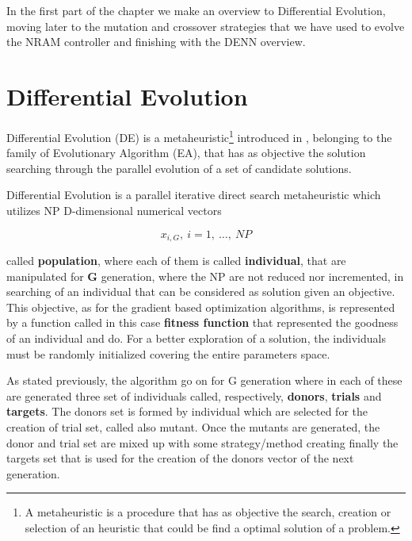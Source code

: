 \label{chap:differential-evolution}
In the first part of the chapter we make an overview to Differential Evolution, moving later to the mutation and crossover strategies that we have used to evolve the NRAM controller and finishing with the DENN overview.

\section{Differential Evolution}
Differential Evolution (DE) is a metaheuristic\footnote{A metaheuristic is a procedure that has as objective the search, creation or selection of an heuristic that could be find a optimal solution of a problem.} introduced in \cite{DESEHGOCS:1997}, belonging to the family of Evolutionary Algorithm (EA), that has as objective the solution searching through the parallel evolution of a set of candidate solutions. 

Differential Evolution is a parallel iterative direct search metaheuristic which utilizes NP D-dimensional numerical vectors 
\begin{center}
	\begin{equation}
		x_{i, G},\ i=1,\ \dots,\ NP 
	\end{equation}
\end{center}
called \textbf{population}, where each of them is called \textbf{individual}, that are manipulated for \textbf{G} generation, where the NP are not reduced nor incremented, in searching of an individual that can be considered as solution given an objective. This objective, as for the gradient based optimization algorithms, is represented by a function called in this case \textbf{fitness function} that represented the goodness of an individual and do. For a better exploration of a solution, the individuals must be randomly initialized covering the entire parameters space. 

As stated previously, the algorithm go on for G generation where in each of these are generated three set of individuals called, respectively, \textbf{donors}, \textbf{trials} and \textbf{targets}. The donors set is formed by individual which are selected for the creation of trial set, called also mutant. Once the mutants are generated, the donor and trial set are mixed up with some strategy/method creating finally the targets set that is used for the creation of the donors vector of the next generation. \\

